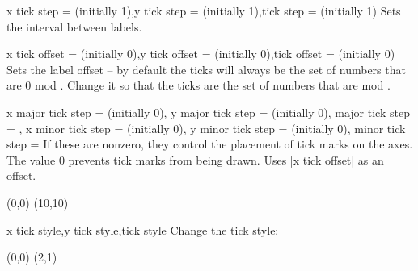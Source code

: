 \begin{sseqdata}[name = basic, cohomological Serre grading]
\begin{keylist}{x tick step =  (initially 1),y tick step =  (initially 1),tick step =  (initially 1)}
Sets the interval between labels.
\end{keylist}

\begin{keylist}{x tick offset =  (initially 0),y tick offset =  (initially 0),tick offset =  (initially 0)}
Sets the label offset -- by default the ticks will always be the set of numbers that are 0 mod . Change it so that the ticks are the set of numbers that are  mod .
\end{keylist}

\begin{keylist}{
    x major tick step =  (initially 0),
    y major tick step =  (initially 0),
    major tick step = ,
    x minor tick step =  (initially 0),
    y minor tick step =  (initially 0),
    minor tick step = %
}
If these are nonzero, they control the placement of tick marks on the axes. The value 0 prevents tick marks from being drawn. Uses |x tick offset| as an offset.
\begin{codeexample}[width=7cm]
\begin{sseqpage}[
    tick step = 5,
    major tick step = 5,
    minor tick step = 1,
    scale = 0.4,
    axes type = frame
]
\class(0,0)
\class(10,10)
\end{sseqpage}
\end{codeexample}
\end{keylist}

\begin{stylekeylist}{x tick style,y tick style,tick style}
Change the tick style:
\begin{codeexample}[width = 7cm]
\begin{sseqpage}[ tick style = { blue, font = \tiny } ]
\class(0,0) \class(2,1)
\end{sseqpage}
\end{codeexample}
\end{stylekeylist}


\end{sseqdata}
